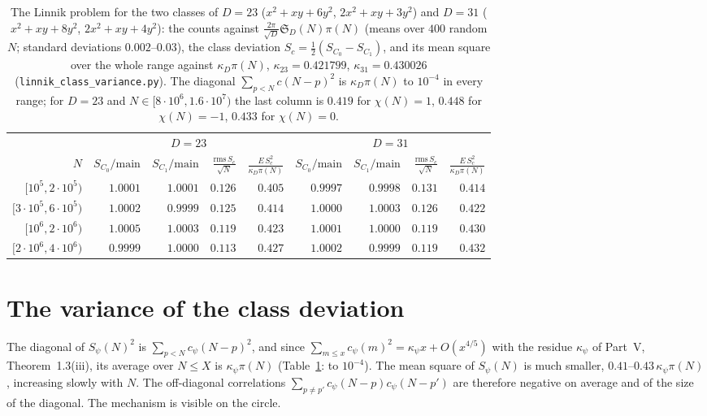 \documentclass[11pt]{amsart}
\theoremstyle{remark}
\newcommand{\sS}{\mathfrak S}
\begin{document}
\begin{table}[htbp]
\centering\footnotesize\setlength{\tabcolsep}{5pt}
\begin{tabular}{r|rrrr|rrrr}
\toprule
 & \multicolumn{4}{c|}{$D=23$} & \multicolumn{4}{c}{$D=31$}\\
$N$ & $S_{C_0}/\mathrm{main}$ & $S_{C_1}/\mathrm{main}$ & $\frac{\mathrm{rms}\,S_c}{\sqrt N}$ & $\frac{E\,S_c^2}{\kappa_D\pi(N)}$ & $S_{C_0}/\mathrm{main}$ & $S_{C_1}/\mathrm{main}$ & $\frac{\mathrm{rms}\,S_c}{\sqrt N}$ & $\frac{E\,S_c^2}{\kappa_D\pi(N)}$\\
\midrule
$[10^5,2\cdot10^5)$ & $1.0001$ & $1.0001$ & $0.126$ & $0.405$ & $0.9997$ & $0.9998$ & $0.131$ & $0.414$\\
$[3\cdot10^5,6\cdot10^5)$ & $1.0002$ & $0.9999$ & $0.125$ & $0.414$ & $1.0000$ & $1.0003$ & $0.126$ & $0.422$\\
$[10^6,2\cdot10^6)$ & $1.0005$ & $1.0003$ & $0.119$ & $0.423$ & $1.0001$ & $1.0000$ & $0.119$ & $0.430$\\
$[2\cdot10^6,4\cdot10^6)$ & $0.9999$ & $1.0000$ & $0.113$ & $0.427$ & $1.0002$ & $0.9999$ & $0.119$ & $0.432$\\
\bottomrule
\end{tabular}
\medskip
\caption{The Linnik problem for the two classes of $D=23$ ($x^2+xy+6y^2$, $2x^2+xy+3y^2$) and $D=31$ ($x^2+xy+8y^2$, $2x^2+xy+4y^2$): the counts against $\frac{2\pi}{\sqrt D}\sS_D(N)\pi(N)$ (means over $400$ random $N$; standard deviations $0.002$--$0.03$), the class deviation $S_c=\frac12(S_{C_0}-S_{C_1})$, and its mean square over the whole range against $\kappa_D\pi(N)$, $\kappa_{23}=0.421799$, $\kappa_{31}=0.430026$ (\texttt{linnik\_class\_variance.py}). The diagonal $\sum_{p<N}c(N-p)^2$ is $\kappa_D\pi(N)$ to $10^{-4}$ in every range; for $D=23$ and $N\in[8\cdot10^6,1.6\cdot10^7)$ the last column is $0.419$ for $\chi(N)=1$, $0.448$ for $\chi(N)=-1$, $0.433$ for $\chi(N)=0$.}
\label{tab:ratios}
\end{table}

\section{The variance of the class deviation}
The diagonal of $S_\psi(N)^2$ is $\sum_{p<N}c_\psi(N-p)^2$, and since $\sum_{m\le x}c_\psi(m)^2=\kappa_\psi x+O(x^{4/5})$ with the residue $\kappa_\psi$ of Part~V, Theorem~1.3(iii), its average over $N\le X$ is $\kappa_\psi\pi(N)$ (Table~\ref{tab:ratios}: to $10^{-4}$). The mean square of $S_\psi(N)$ is much smaller, $0.41$--$0.43\,\kappa_\psi\pi(N)$, increasing slowly with $N$. The off-diagonal correlations $\sum_{p\ne p'}c_\psi(N-p)c_\psi(N-p')$ are therefore negative on average and of the size of the diagonal. The mechanism is visible on the circle.
\end{document}
